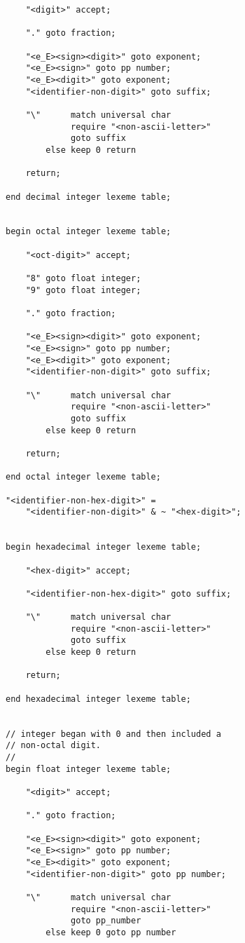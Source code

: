 \documentclass[12pt]{article}
\newenvironment{indpar}[1][0.3in]%
	{\begin{list}{}%
		     {\setlength{\itemsep}{0in}%
		      \setlength{\topsep}{0in}%
		      \setlength{\parsep}{1ex}%
		      \setlength{\labelwidth}{#1}%
		      \setlength{\leftmargin}{#1}%
		      \addtolength{\leftmargin}{\labelsep}}%
	 \item}%
	{\end{list}}
\begin{document}
\begin{indpar}
\begin{verbatim}
    "<digit>" accept;

    "." goto fraction;

    "<e_E><sign><digit>" goto exponent;
    "<e_E><sign>" goto pp number;
    "<e_E><digit>" goto exponent;
    "<identifier-non-digit>" goto suffix;

    "\"      match universal char
             require "<non-ascii-letter>"
             goto suffix
        else keep 0 return

    return;

end decimal integer lexeme table;


begin octal integer lexeme table;

    "<oct-digit>" accept;

    "8" goto float integer;
    "9" goto float integer;

    "." goto fraction;

    "<e_E><sign><digit>" goto exponent;
    "<e_E><sign>" goto pp number;
    "<e_E><digit>" goto exponent;
    "<identifier-non-digit>" goto suffix;

    "\"      match universal char
             require "<non-ascii-letter>"
             goto suffix
        else keep 0 return

    return;

end octal integer lexeme table;

"<identifier-non-hex-digit>" =
    "<identifier-non-digit>" & ~ "<hex-digit>";


begin hexadecimal integer lexeme table;

    "<hex-digit>" accept;

    "<identifier-non-hex-digit>" goto suffix;

    "\"      match universal char
             require "<non-ascii-letter>"
             goto suffix
        else keep 0 return

    return;

end hexadecimal integer lexeme table;


// integer began with 0 and then included a
// non-octal digit.
//
begin float integer lexeme table;

    "<digit>" accept;

    "." goto fraction;

    "<e_E><sign><digit>" goto exponent;
    "<e_E><sign>" goto pp number;
    "<e_E><digit>" goto exponent;
    "<identifier-non-digit>" goto pp number;

    "\"      match universal char
             require "<non-ascii-letter>"
             goto pp_number
        else keep 0 goto pp number


\end{verbatim}
\end{indpar}
\end{document}
